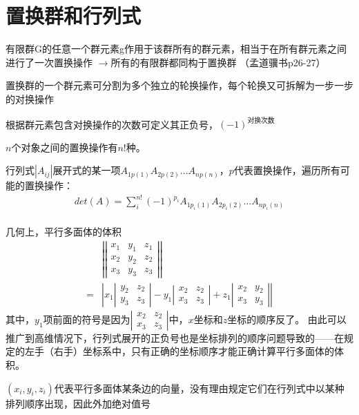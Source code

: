 \section{置换群和行列式}

有限群G的任意一个群元素g作用于该群所有的群元素，相当于在所有群元素之间进行了一次置换操作
$\rightarrow$所有的有限群都同构于置换群
（孟道骥书\cite{meng2010}p26-27）

置换群的一个群元素可分割为多个独立的轮换操作，每个轮换又可拆解为一步一步的对换操作

根据群元素包含对换操作的次数可定义其正负号，$(-1)^{\text{对换次数}}$

$n$个对象之间的置换操作有$n!$种。

行列式$|A_{ij}|$展开式的某一项$A_{1p(1)}A_{2p(2)}...A_{np(n)}$，$p$代表置换操作，遍历所有可能的置换操作：
\begin{gather}
    det(A)=\sum_{i}^{n!} (-1)^{p_{i}}A_{1p_{i}(1)}A_{2p_{i}(2)}...A_{np_{i}(n)}
\end{gather}
\\

几何上，平行多面体的体积
\begin{align}
    &\left | \left | \begin{matrix}
        x_{1} &y_{1} & z_{1} \\
        x_{2} &y_{2} & z_{2} \\
        x_{3} &y_{3} & z_{3}
    \end{matrix} \right | \right | \\
    =& \left | x_{1}\left | \begin{matrix} y_{2} & z_{2} \\ y_{3} & z_{3} \end{matrix} \right |
    - y_{1}\left | \begin{matrix} x_{2} & z_{2} \\ x_{3} & z_{3} \end{matrix} \right |
    + z_{1}\left | \begin{matrix} x_{2} & y_{2} \\ x_{3} & y_{3} \end{matrix} \right | \right |
\end{align}
其中，$y_{1}$项前面的符号是因为$\left | \begin{matrix} x_{2} & z_{2} \\ x_{3} & z_{3} \end{matrix} \right |$中，$x$坐标和$z$坐标的顺序反了。
由此可以推广到高维情况下，行列式展开的正负号也是坐标排列的顺序问题导致的——在规定的左手（右手）坐标系中，只有正确的坐标顺序才能正确计算平行多面体的体积。

$(x_{i}, y_{i}, z_{i})$代表平行多面体某条边的向量，没有理由规定它们在行列式中以某种排列顺序出现，因此外加绝对值号

